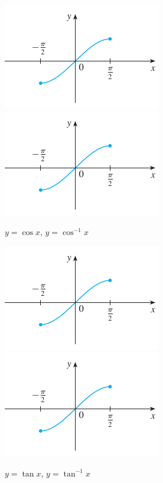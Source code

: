 \documentclass[12pt]{extarticle}
\theoremstyle{definition}
\begin{document}
\vspace{-1cm}
\begin{figure}[!htbp]
  \centering
  \includegraphics[height=.25\textheight,page=3]{fig/trig.pdf}\hspace{2cm}
  \includegraphics[height=.25\textheight,page=4]{fig/trig.pdf}
  \caption{$y = \cos x$, $y = \cos^{-1} x$}
\end{figure}

\vspace{-1cm}
\begin{figure}[!htbp]
  \centering
  \includegraphics[height=.25\textheight,page=5]{fig/trig.pdf}\hspace{2cm}
  \includegraphics[height=.25\textheight,page=6]{fig/trig.pdf}
  \caption{$y = \tan x$, $y = \tan^{-1} x$}
\end{figure}
\end{document}
